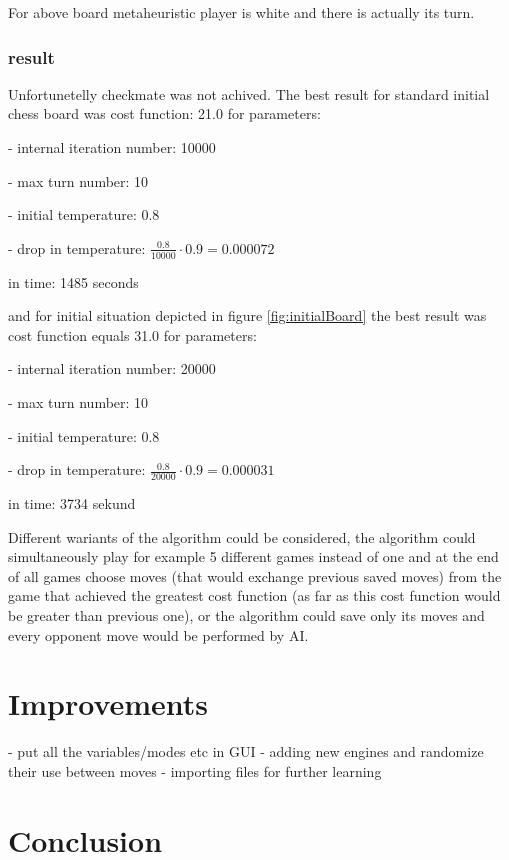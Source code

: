 \documentclass[pdftex]{article}
\begin{document}
For above board metaheuristic player is white and there is actually its turn.
 
\subsubsection{result}
Unfortunetelly checkmate was not achived. The best result for standard initial chess board was cost function: 21.0 for parameters:

- internal iteration number: 10000

- max turn number: 10

- initial temperature: 0.8

- drop in temperature: $\frac{0.8}{10000} \cdot 0.9 = 0.000072$

in time: 1485 seconds
\newline

and for initial situation depicted in figure \ref{fig:initialBoard} the best result was cost function equals 31.0 for parameters:

- internal iteration number: 20000

- max turn number: 10

- initial temperature: 0.8

- drop in temperature: $\frac{0.8}{20000} \cdot 0.9 = 0.000031$

in time: 3734 sekund
\newline

Different wariants of the algorithm could be considered, the algorithm could simultaneously play for example 5 different games instead of one and at the end of all games choose moves (that would exchange previous saved moves) from the game that achieved the greatest cost function (as far as this cost function would be greater than previous one), or the algorithm could save only its moves and every opponent move would be performed by AI.



\section{Improvements}
\label{sec:improvements}

- put all the variables/modes etc in GUI
- adding new engines and randomize their use between moves
- importing files for further learning

\section{Conclusion}
\label{sec:conclusion}
\end{document}
